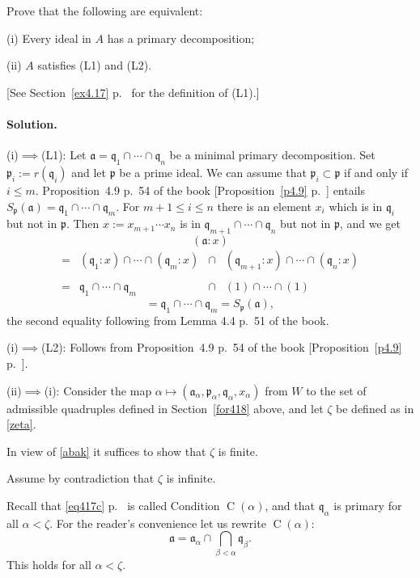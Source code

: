 \documentclass[12pt,letterpaper]{article}%
\newcommand{\oo}{\operatorname}\newcommand{\ooo}{\operatorname*}
\newcommand{\mf}{\mathfrak}
\newcommand{\aaa}{\mf a}
\newcommand{\ppp}{\mf p}
\newcommand{\qqq}{\mf q}
\newcommand{\nn}{\noindent}
\begin{document}
Prove that the following are equivalent:

\nn(i) Every ideal in $A$ has a primary decomposition;

\nn(ii) $A$ satisfies (L1) and (L2).

[See Section~\ref{ex4.17} p.~\pageref{ex4.17} for the definition of (L1).]

\paragraph{Solution.}%

\nn(i)$\implies$(L1): Let $\aaa=\qqq_1\cap\cdots\cap\qqq_n$ be a minimal primary decomposition. Set $\ppp_i:=r(\qqq_i)$ and let $\ppp$ be a prime ideal. We can assume that $\ppp_i\subset\ppp$ if and only if $i\le m$. Proposition~4.9 p.~54 of the book [Proposition~\ref{p4.9} p.~\pageref{p4.9}] entails $S_\ppp(\aaa)=\qqq_1\cap\cdots\cap\qqq_m$. For $m+1\le i\le n$ there is an element $x_i$ which is in $\qqq_i$ but not in $\ppp$. Then $x:=x_{m+1}\cdots x_n$ is in $\qqq_{m+1}\cap\cdots\cap\qqq_n$ but not in $\ppp$, and we get 
$$
(\aaa:x)
$$
$$
\begin{matrix}
=&(\qqq_1:x)\cap\cdots\cap(\qqq_m:x)&\cap&(\qqq_{m+1}:x)\cap\cdots\cap(\qqq_n:x)\\ \\ 
=&\qqq_1\cap\cdots\cap\qqq_m&\cap&(1)\cap\cdots\cap(1)
\end{matrix}
$$
$$
=\qqq_1\cap\cdots\cap\qqq_m=S_\ppp(\aaa),
$$ 
the second equality following from Lemma 4.4 p.~51 of the book.

\nn(i)$\implies$(L2): Follows from Proposition~4.9 p.~54 of the book [Proposition~\ref{p4.9} p.~\pageref{p4.9}].

\nn(ii)$\implies$(i): Consider the map $\alpha\mapsto(\aaa_\alpha,\ppp_\alpha,\qqq_\alpha,x_\alpha)$ from $W$ to the set of admissible quadruples defined in Section~\ref{for418} above, and let $\zeta$ be defined as in \eqref{zeta}. 

In view of \eqref{abak} it suffices to show that $\zeta$ is finite. 

Assume by contradiction that $\zeta$ is infinite.

Recall that \eqref{eq417c} p.~\pageref{eq417c} is called Condition $\oo C(\alpha)$, and that $\qqq_\alpha$ is primary for all $\alpha<\zeta$. For the reader's convenience let us rewrite $\oo C(\alpha)$:
$$
\aaa=\aaa_\alpha\cap\bigcap_{\beta<\alpha}\qqq_\beta.
$$ 
This holds for all $\alpha<\zeta$.
\end{document}
